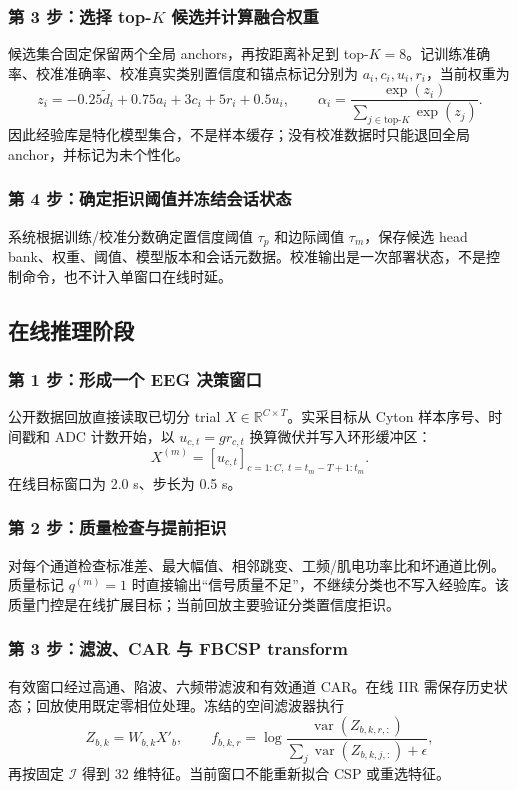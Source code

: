 \documentclass[
    TwoSide=false,
    Degree=graduate,
    GradLevel=master,
    Type=thesis,
    Title={光电混合运动想象脑机接口技术文档}
]{zjuthesis}
\begin{document}
\subsubsection{第 3 步：选择 top-$K$ 候选并计算融合权重}
候选集合固定保留两个全局 anchors，再按距离补足到 top-$K=8$。记训练准确率、校准准确率、校准真实类别置信度和锚点标记分别为 $a_i,c_i,u_i,r_i$，当前权重为
\begin{equation}\label{eq:retrieval-weight}
z_i=-0.25\tilde d_i+0.75a_i+3c_i+5r_i+0.5u_i,
\qquad
\alpha_i=\frac{\exp(z_i)}{\sum_{j\in\mathrm{top}\text{-}K}\exp(z_j)}.
\end{equation}
因此经验库是特化模型集合，不是样本缓存；没有校准数据时只能退回全局 anchor，并标记为未个性化。

\subsubsection{第 4 步：确定拒识阈值并冻结会话状态}
系统根据训练/校准分数确定置信度阈值 $\tau_p$ 和边际阈值 $\tau_m$，保存候选 head bank、权重、阈值、模型版本和会话元数据。校准输出是一次部署状态，不是控制命令，也不计入单窗口在线时延。

\subsection{在线推理阶段}
\subsubsection{第 1 步：形成一个 EEG 决策窗口}
公开数据回放直接读取已切分 trial $X\in\mathbb{R}^{C\times T}$。实采目标从 Cyton 样本序号、时间戳和 ADC 计数开始，以 $u_{c,t}=g r_{c,t}$ 换算微伏并写入环形缓冲区：
\begin{equation}\label{eq:windowing}
X^{(m)}=\left[u_{c,t}\right]_{c=1:C,\;t=t_m-T+1:t_m}.
\end{equation}
在线目标窗口为 2.0 s、步长为 0.5 s。

\subsubsection{第 2 步：质量检查与提前拒识}
对每个通道检查标准差、最大幅值、相邻跳变、工频/肌电功率比和坏通道比例。质量标记 $q^{(m)}=1$ 时直接输出“信号质量不足”，不继续分类也不写入经验库。该质量门控是在线扩展目标；当前回放主要验证分类置信度拒识。

\subsubsection{第 3 步：滤波、CAR 与 FBCSP transform}
有效窗口经过高通、陷波、六频带滤波和有效通道 CAR。在线 IIR 需保存历史状态；回放使用既定零相位处理。冻结的空间滤波器执行
\begin{equation}
Z_{b,k}=W_{b,k}X'_b,\qquad f_{b,k,r}=\log\frac{\operatorname{var}(Z_{b,k,r,:})}{\sum_j\operatorname{var}(Z_{b,k,j,:})+\epsilon},
\end{equation}
再按固定 $\mathcal I$ 得到 32 维特征。当前窗口不能重新拟合 CSP 或重选特征。
\end{document}
